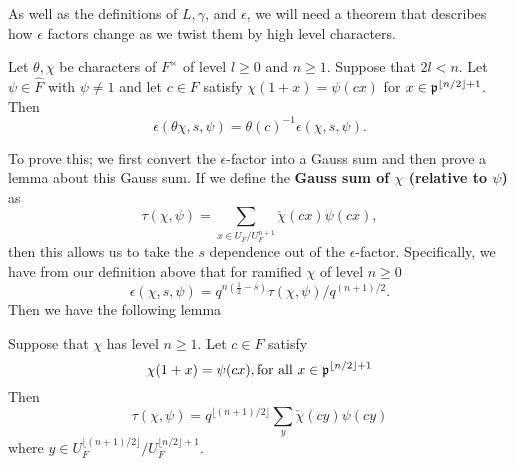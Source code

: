 As well as the definitions of $L, \gamma$, and $\epsilon$, we will need a theorem that describes how $\epsilon$ factors change as we twist them by high level characters.

\begin{theorem}
  \label{thm:Stability}
  Let $\theta, \chi$ be characters of $F^\times$ of level $ l \geq 0$ and $n \geq 1$.
  Suppose that $2l < n$.
  Let $\psi \in \hat{F}$ with $\psi \neq 1$ and let $c \in F$ satisfy $\chi(1+x) = \psi(cx)$ for $x \in \mathfrak{p}^{\lfloor n/2 \rfloor + 1}$.
  Then
  \[ \epsilon(\theta \chi, s, \psi) = \theta(c)^{-1} \epsilon(\chi, s, \psi).\]
\end{theorem}

To prove this; we first convert the $\epsilon$-factor into a Gauss sum and then prove a lemma about this Gauss sum.
If we define the \textbf{Gauss sum of $\chi$ (relative to $\psi$)} as
\[\tau(\chi, \psi) = \sum_{x \in U_F/U_F^{n+1}} \check{\chi}(cx) \psi(cx),\]
then this allows us to take the $s$ dependence out of the $\epsilon$-factor.
Specifically, we have from our definition above that for ramified $\chi$ of level $n \geq 0$
\[\epsilon(\chi, s, \psi) = q^{n(\frac{1}{2} - s)} \tau(\chi, \psi)/ q^{(n+1)/2}.\]
Then we have the following lemma
\label{lem:Gauss-sum-reduction}
\begin{lemma}
  Suppose that $\chi$ has level $n \geq 1$.
  Let $c \in F$ satisfy
  \[ \chi(1 +x) = \psi(cx), \textrm{for all } x\in \mathfrak{p}^{\lfloor n/2 \rfloor + 1}\]
  Then
  \[\tau(\chi, \psi) = q^{\lfloor (n+1)/2 \rfloor} \sum_y \check{\chi}(cy) \psi(cy)\]
  where $y \in U_F^{\lfloor (n+1)/2 \rfloor} / U_F^{\lfloor n/2 \rfloor + 1}$.
\end{lemma}

